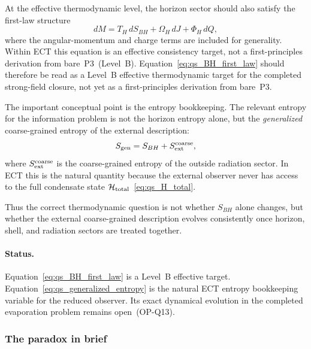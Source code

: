 At the effective thermodynamic level, the horizon sector should also
satisfy the first-law structure
\begin{equation}
  \label{eq:qs_BH_first_law}
  dM = T_H\,dS_{BH} + \Omega_H\,dJ + \Phi_H\,dQ,
\end{equation}
where the angular-momentum and charge terms are included for generality.
Within ECT this equation is an effective consistency target, not a
first-principles derivation from bare~P3~(Level~B).
Equation~\eqref{eq:qs_BH_first_law} should therefore be read as a
Level~B effective thermodynamic target for the completed strong-field
closure, not yet as a first-principles derivation from bare~P3.

The important conceptual point is the entropy bookkeeping.
The relevant entropy for the information problem is not the horizon
entropy alone, but the \emph{generalized} coarse-grained entropy of the
external description:
\begin{equation}
  \label{eq:qs_generalized_entropy}
  S_{\rm gen}
  = S_{BH} + S_{\rm ext}^{\rm coarse},
\end{equation}
where $S_{\rm ext}^{\rm coarse}$ is the coarse-grained entropy of the
outside radiation sector.
In ECT this is the natural quantity because the external observer never
has access to the full condensate state
$\mathcal{H}_{\rm total}$~\eqref{eq:qs_H_total}.

Thus the correct thermodynamic question is not whether $S_{BH}$ alone
changes, but whether the external coarse-grained description evolves
consistently once horizon, shell, and radiation sectors are treated
together.

\paragraph{Status.}
Equation~\eqref{eq:qs_BH_first_law} is a Level~B effective target.
Equation~\eqref{eq:qs_generalized_entropy} is the natural ECT entropy
bookkeeping variable for the reduced observer.
Its exact dynamical evolution in the completed evaporation problem
remains open~(OP-Q13).

\subsubsection*{The paradox in brief}

